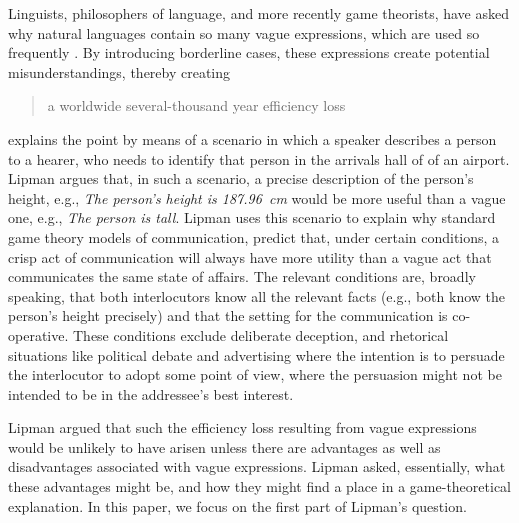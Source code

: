 \documentclass[graybox,envcountchap,sectrefs%
,footinfo
]{svmono}
\begin{document}
Linguists, philosophers of language, and more recently game theorists, have asked why natural languages contain so many vague expressions, which are used so frequently \cite{Lipman:2000fk, lipmanvague}. By introducing borderline cases, these expressions create potential misunderstandings, thereby creating \begin{quotation}a worldwide several-thousand year efficiency loss \cite[p.\ 1]{lipmanvague}\end{quotation} \citeauthor{lipmanvague} explains the point by means of a scenario in which a speaker describes a person to a hearer, who needs to identify that person in the arrivals hall of of an airport. Lipman argues that, in such a scenario, a precise description of the person's height, e.g., \textsl{The person's height is 187.96~cm} would be more useful than a vague one, e.g., \textsl{The person is tall}. Lipman uses this scenario to explain why standard game theory models of communication, \citep[e.g.][]{Crawford:1982lr} predict that, under certain conditions, a crisp act of communication will always have more utility than a vague act that communicates the same state of affairs. The relevant conditions are, broadly speaking, that both interlocutors know all the relevant facts (e.g., both know the person's height precisely) and that the setting for the communication is co-operative. These conditions exclude deliberate deception, and rhetorical situations like political debate and advertising where the intention is to persuade the interlocutor to adopt some point of view, where the persuasion might not be intended to be in the addressee's best interest. 

Lipman argued that such the efficiency loss resulting from vague expressions would be unlikely to have arisen unless there are advantages as well as disadvantages associated with vague expressions. Lipman asked, essentially, what these advantages might be, and how they might find a place in a game-theoretical explanation. In this paper, we focus on the first part of Lipman's question.
\end{document}
